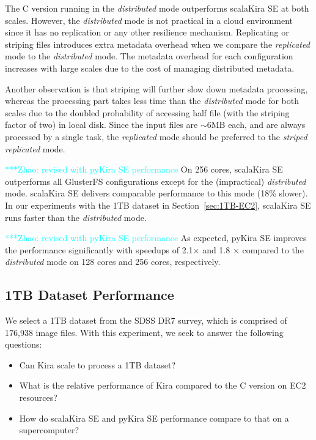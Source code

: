 \documentclass[10pt,journal,compsoc]{IEEEtran}
\newcommand{\zhaonote}[1]{{\textcolor{cyan}    { ***Zhao:      #1 }}}
\newcommand{\zhaonote}[1]{}
\begin{document}
The C version running in the \emph{distributed} mode outperforms scalaKira SE at both scales. 
However, the \emph{distributed} mode is not practical in a cloud environment since
it has no replication or any other resilience mechanism. Replicating or striping
files introduces extra metadata overhead when we compare the \emph{replicated} mode
to the \emph{distributed} mode. The metadata overhead for each configuration increases
with large scales due to the cost of managing distributed metadata.

Another observation is that striping will further slow down metadata processing, whereas the
processing part takes less time than the \emph{distributed} mode for both scales due
to the doubled probability of accessing half file (with the striping factor of two) in local disk.
Since the input files are $\sim$6MB each, and are always processed by a single task, the
\emph{replicated} mode should be preferred to the \emph{striped replicated} mode.

\zhaonote{revised with pyKira SE performance}
On 256 cores, scalaKira SE outperforms all GlusterFS configurations except for the (impractical) \emph{distributed}
mode. scalaKira SE delivers comparable performance to this mode (18\% slower). 
In our experiments with the 1TB dataset in Section~\ref{sec:1TB-EC2}, 
scalaKira SE runs faster than the \emph{distributed} mode.

\zhaonote{revised with pyKira SE performance}
As expected, pyKira SE improves the performance significantly with speedups of 2.1$\times$ and 1.8 $\times$
compared to the \emph{distributed} mode on 128 cores and 256 cores, respectively.

\subsection{1TB Dataset Performance}
\label{sec:Performance-1TB}

We select a 1TB dataset from the SDSS DR7 survey, which is comprised of 176,938 image files. 
With this experiment, we seek to answer the following questions: 

\begin{itemize}
\item Can Kira scale to process a 1TB dataset?
\item What is the relative performance of Kira compared to the C version on EC2 resources?
\item How do scalaKira SE and pyKira SE performance compare to that on a supercomputer?
\end{itemize}
\end{document}
